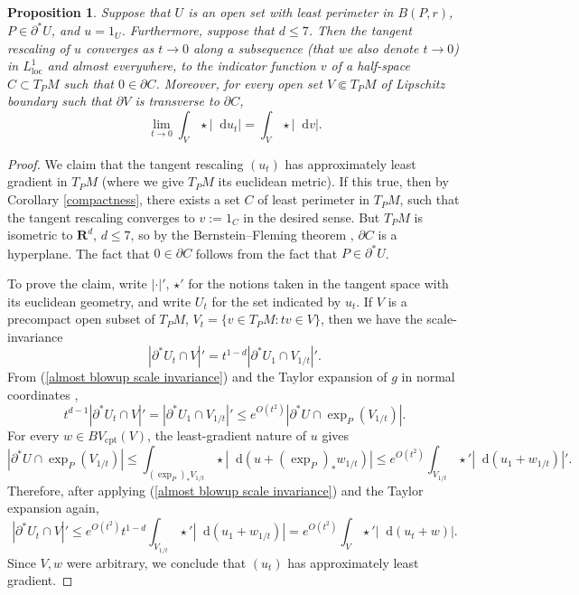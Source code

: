 \documentclass[reqno,12pt,letterpaper]{amsart}
\newcommand{\RR}{\mathbf{R}}
\newcommand*\dif{\mathop{}\!\mathrm{d}}
\newcommand{\loc}{\mathrm{loc}}
\newcommand{\cpt}{\mathrm{cpt}}
\newtheorem{proposition}[theorem]{Proposition}
\theoremstyle{definition}
\numberwithin{equation}{section}
\begin{document}
\begin{proposition}\label{blowup theorem}
Suppose that $U$ is an open set with least perimeter in $B(P, r)$, $P \in \partial^* U$, and $u = 1_U$.
Furthermore, suppose that $d \leq 7$.
Then the tangent rescaling of $u$ converges as $t \to 0$ along a subsequence (that we also denote $t \to 0$) in $L^1_\loc$ and almost everywhere, to the indicator function $v$ of a half-space $C \subset T_PM$ such that $0 \in \partial C$.
Moreover, for every open set $V \Subset T_PM$ of Lipschitz boundary such that $\partial V$ is transverse to $\partial C$,
$$\lim_{t \to 0} \int_V \star |\dif u_t| = \int_V \star |\dif v|.$$
\end{proposition}
\begin{proof}
We claim that the tangent rescaling $(u_t)$ has approximately least gradient in $T_PM$ (where we give $T_PM$ its euclidean metric). If this true, then by Corollary \ref{compactness}, there exists a set $C$ of least perimeter in $T_PM$, such that the tangent rescaling converges to $v := 1_C$ in the desired sense.
But $T_PM$ is isometric to $\RR^d$, $d \leq 7$, so by the Bernstein--Fleming theorem \cite[Theorem 17.3]{Giusti77}, $\partial C$ is a hyperplane.
The fact that $0 \in \partial C$ follows from the fact that $P \in \partial^* U$.

To prove the claim, write $|\cdot|'$, $\star'$ for the notions taken in the tangent space with its euclidean geometry, and write $U_t$ for the set indicated by $u_t$.
If $V$ is a precompact open subset of $T_PM$, $V_t = \{v \in T_PM: tv \in V\}$, then we have the scale-invariance
\begin{equation}\label{almost blowup scale invariance}
|\partial^* U_t \cap V|' = t^{1 - d}|\partial^* U_1 \cap V_{1/t}|'.
\end{equation}
From (\ref{almost blowup scale invariance}) and the Taylor expansion of $g$ in normal coordinates \cite[Lemma 3.4]{schoen1994lectures},
$$t^{d - 1} |\partial^* U_t \cap V|' = |\partial^* U_1 \cap V_{1/t}|' \leq e^{O(t^2)} |\partial^* U \cap \exp_P(V_{1/t})|.$$
For every $w \in BV_\cpt(V)$, the least-gradient nature of $u$ gives
$$|\partial^* U \cap \exp_P(V_{1/t})| \leq \int_{(\exp_P)_* V_{1/t}} \star |\dif(u + (\exp_P)_* w_{1/t})| \leq e^{O(t^2)} \int_{V_{1/t}} \star'|\dif(u_1 + w_{1/t})|'.$$
Therefore, after applying (\ref{almost blowup scale invariance}) and the Taylor expansion again,
$$|\partial^* U_t \cap V|' \leq e^{O(t^2)} t^{1 - d} \int_{V_{1/t}} \star' |\dif (u_1 + w_{1/t})| = e^{O(t^2)} \int_V \star' |\dif (u_t + w)|.$$
Since $V,w$ were arbitrary, we conclude that $(u_t)$ has approximately least gradient.
\end{proof}
\end{document}
